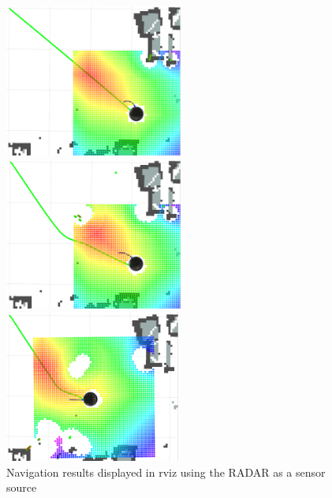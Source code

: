 \begin{figure}[h] 
    \begin{minipage}[t]{.32\linewidth}
        \includegraphics[height=5cm,width=\linewidth]{imgs/chapter5/radar1.png}
    \end{minipage}
    \begin{minipage}[t]{.32\linewidth}
        \includegraphics[height=5cm,width=\linewidth]{imgs/chapter5/radar2.png}
    \end{minipage}
     \begin{minipage}[t]{.32\linewidth}
        \includegraphics[height=5cm,width=\linewidth]{imgs/chapter5/radar3.png}
    \end{minipage}
    \caption{Navigation results displayed in rviz using the \ac{RADAR} as a sensor source}
    \label{fig:scan_results_chair}
\end{figure}
